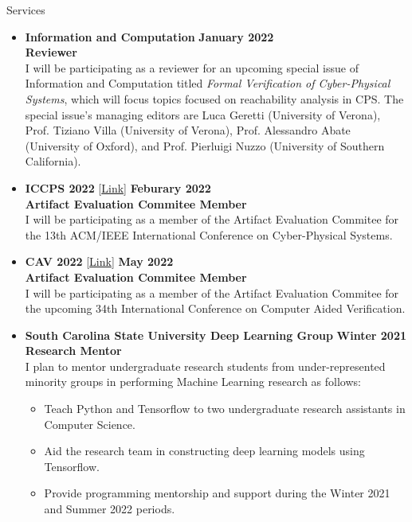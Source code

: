 \documentclass{resume} %
\begin{document}
\begin{rSection}{Services}

\begin{itemize}[leftmargin=*]
  \item {\bf Information and Computation} \hfill {\bf January 2022} \\
       {\bf Reviewer} \\
  I will be participating as a reviewer for an upcoming special issue of Information and Computation titled \textit{Formal Verification of Cyber-Physical Systems}, which will focus topics focused on reachability analysis in CPS. The special issue's managing editors are Luca Geretti (University of Verona), Prof. Tiziano Villa (University of Verona), Prof. Alessandro Abate (University of Oxford), and Prof. Pierluigi Nuzzo (University of Southern California).

 \item {\bf ICCPS 2022} [\href{https://iccps.acm.org/2022/}{Link}] \hfill {\bf Feburary 2022}  \\
       {\bf Artifact Evaluation Commitee Member} \\
  I will be participating as a member of the Artifact Evaluation Commitee for the 13th ACM/IEEE International Conference on Cyber-Physical Systems.


  \item {\bf CAV 2022} [\href{http://i-cav.org/2022/organization/ }{Link}] \hfill {\bf May 2022}  \\
       {\bf Artifact Evaluation Commitee Member} \\
  I will be participating as a member of the Artifact Evaluation Commitee for the upcoming 34th International Conference on Computer Aided Verification.

\item
      {\bf South Carolina State University Deep Learning Group} \hfill {\bf Winter 2021} \\
        {\bf Research Mentor} \\
      I plan to mentor undergraduate research students from under-represented minority groups in performing Machine Learning research as follows:

      \begin{itemize}[label=$\blackdiamond$]
        \item Teach Python and Tensorflow to two undergraduate research assistants in Computer Science.
        \item Aid the research team in constructing deep learning models using Tensorflow.
        \item Provide programming mentorship and support during the Winter 2021 and Summer 2022 periods.
      \end{itemize}


\end{itemize}
\end{rSection}
\end{document}
